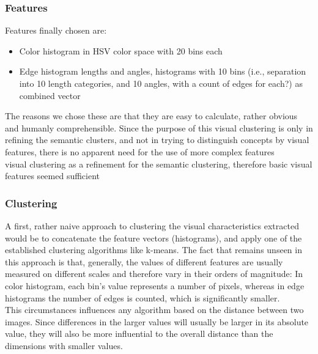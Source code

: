 \subsubsection{Features}
Features finally chosen are:
\begin{itemize}
\item{Color histogram} in HSV color space with 20 bins each
\item{Edge histogram} lengths and angles, histograms with 10 bins (i.e., separation into 10 length categories, and 10 angles, with a count of edges for each?) as combined vector 
\end{itemize}
The reasons we chose these are that they are easy to calculate, rather obvious and humanly comprehensible. Since the purpose of this visual clustering is only in refining the semantic clusters, and not in trying to distinguish concepts by visual features, there is no apparent need for the use of more complex features \\
visual clustering as a refinement for the semantic clustering, therefore basic visual features seemed sufficient 


\subsubsection{Clustering}
A first, rather naive approach to clustering the visual characteristics extracted would be to concatenate the feature vectors (histograms), and apply one of the established clustering algorithms like k-means.  The fact that remains unseen in this approach is that, generally, the values of different features are usually measured on different scales and therefore vary in their orders of magnitude: In color histogram, each bin's value represents a number of pixels, whereas in edge histograms the number of edges is counted, which is significantly smaller. \\
This circumstances influences any algorithm based on the distance between two images. Since differences in the larger values will usually be larger in its absolute value, they will also be more influential to the overall distance than the dimensions with smaller values.


